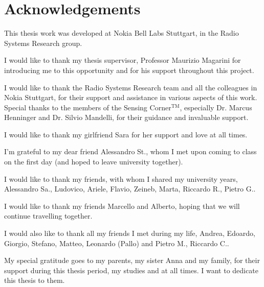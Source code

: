 \documentclass{Configuration_Files/PoliMi3i_thesis}
\begin{document}
\listoffigures

\listoftables



\chapter*{Acknowledgements}
\singlespacing
This thesis work was developed at Nokia Bell Labs Stuttgart, in the Radio Systems Research group.

I would like to thank my thesis supervisor, Professor Maurizio Magarini for introducing me to this opportunity and for his support throughout this project.

I would like to thank the Radio Systems Research team and all the colleagues in Nokia Stuttgart, for their support and assistance in various aspects of this work.
Special thanks to the members of the Sensing Corner$^{\text{TM}}$, especially Dr. Marcus Henninger and Dr. Silvio Mandelli, for their guidance and invaluable support.

I would like to thank my girlfriend Sara for her support and love at all times.

I'm grateful to my dear friend Alessandro St., whom I met upon coming to class on the first day (and hoped to leave university together).

I would like to thank my friends, with whom I shared my university years, Alessandro Sa., Ludovico, Ariele, Flavio, Zeineb, Marta, Riccardo R., Pietro G..

I would like to thank my friends Marcello and Alberto, hoping that we will continue travelling together.

I would also like to thank all my friends I met during my life, Andrea, Edoardo, Giorgio, Stefano, Matteo, Leonardo (Pallo) and Pietro M., Riccardo C..
 
My special gratitude goes to my parents, my sister Anna and my family, for their support during this thesis period, my studies and at all times. I want to dedicate this thesis to them. 


\doublespacing

\cleardoublepage
\end{document}
